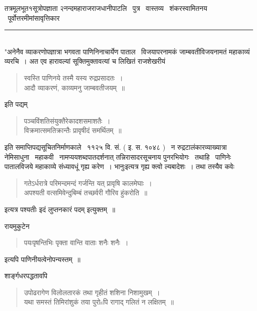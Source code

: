 \documentclass[11pt, openany]{book}
\begin{document}
\begin{multicols}{2}
तत्रमूलभूत१सूत्रोपज्ञाता २नन्दमहाराजराजधानीपाटलि \textendash\ पुत्र \textendash\ वास्तव्य \textendash\ शंकरस्वामितनय \textendash\ पूर्वोत्तरमीमांसावृत्तिकार \textendash\

\noindent
\rule{1\linewidth}{0.5pt}\\

"अनेनैव व्याकरणोपज्ञात्रा भगवता पाणिनिनाचार्येण पाताल \textendash\ विजयापरनामकं जाम्बवतीविजयनामतं महाकाव्यं व्यरचि~। अत एव हारावल्यां सूक्तिमुक्तावत्यां च लिखितं राजशेखरीयं \textendash\

\begin{quote}
{\qt स्वस्ति पाणिनये तस्मै यस्य रुद्रप्रसादतः~।\\
आदौ व्याकरणं, काव्यमनु जाम्बवतीजयम्~॥}
\end{quote}

\noindent
इति पद्यम् \textendash\

\begin{quote}
{\qt पञ्चविंशतिसंयुक्तैरेकादशसमाशतैः~।\\
विक्रमात्समतिक्रान्तैः प्रावृषीदं समर्थितम्~॥}
\end{quote}

इति समाप्तिपद्यसूचितनिर्माणकाले \textendash\ ११२५ वि. सं. ( इ. स. १०४८ ) \textendash\ न रुद्रटालंकारव्याख्यात्रा नेमिसाधुना \textendash\ महाकवी \textendash\ नामप्ययशब्दपातदर्शनात् तन्निरासादरसूचनाय पुनरभियोगः \textendash\ तथाहि \textendash\ पाणिनेः पातालविजये महाकाव्ये {\qt संध्यावधूं गृह्य} करेण~। भानुः{\qt इत्यत्र गृह्य} क्त्वो ल्यबादेशः~। तथा तस्यैव कवेः \textendash\

\begin{quote}
{\qt गतेऽर्धरात्रे परिमन्दमन्दं गर्जन्ति यत् प्रावृषि कालमेघाः~।\\
अपश्यती वत्समिवेन्दुबिम्बं तच्छर्वरी गौरिव हुंकरोति~॥}
\end{quote}

इत्यत्र पश्यतीः इदं लुप्तनकारं पदम् इत्युक्तम्~॥

रायमुकुटेन \textendash\

\begin{quote}
{\qt पयःपृषन्तिभिः पृक्ता वान्ति वाताः शनैः शनैः~।}
\end{quote}

इत्यपि पाणिनीयत्वेनोपन्यस्तम्~॥

शार्ङ्गधरपद्धतावपि \textendash\

\begin{quote}
{\qt उपोढरागेण विलोलतारकं तथा गृहीतं शशिना निशामुखम्~।\\
यथा समस्तं तिमिरांशुकं तया पुरोsपि रागाद् गलितं न लक्षितम्~॥\\

}
\end{quote}
\end{multicols}
\end{document}
